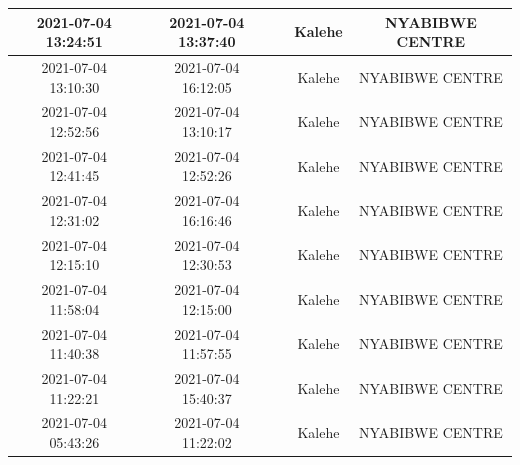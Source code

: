 \documentclass[
]{book}
\begin{document}
\begin{table}
\begin{tabular}[t]{c|c|>{}c|c|c}
\hline
2021-07-04 13:24:51 & 2021-07-04 13:37:40 & \cellcolor[HTML]{2C728E}{\textcolor{white}{13}} & Kalehe & NYABIBWE CENTRE\\
\hline
2021-07-04 13:10:30 & 2021-07-04 16:12:05 & \cellcolor[HTML]{31688E}{\textcolor{white}{182}} & Kalehe & NYABIBWE CENTRE\\
\hline
2021-07-04 12:52:56 & 2021-07-04 13:10:17 & \cellcolor[HTML]{2A788E}{\textcolor{white}{17}} & Kalehe & NYABIBWE CENTRE\\
\hline
2021-07-04 12:41:45 & 2021-07-04 12:52:26 & \cellcolor[HTML]{1F988B}{\textcolor{white}{11}} & Kalehe & NYABIBWE CENTRE\\
\hline
2021-07-04 12:31:02 & 2021-07-04 16:16:46 & \cellcolor[HTML]{23888E}{\textcolor{white}{226}} & Kalehe & NYABIBWE CENTRE\\
\hline
2021-07-04 12:15:10 & 2021-07-04 12:30:53 & \cellcolor[HTML]{23888E}{\textcolor{white}{16}} & Kalehe & NYABIBWE CENTRE\\
\hline
2021-07-04 11:58:04 & 2021-07-04 12:15:00 & \cellcolor[HTML]{365D8D}{\textcolor{white}{17}} & Kalehe & NYABIBWE CENTRE\\
\hline
2021-07-04 11:40:38 & 2021-07-04 11:57:55 & \cellcolor[HTML]{1F988B}{\textcolor{white}{17}} & Kalehe & NYABIBWE CENTRE\\
\hline
2021-07-04 11:22:21 & 2021-07-04 15:40:37 & \cellcolor[HTML]{277E8E}{\textcolor{white}{258}} & Kalehe & NYABIBWE CENTRE\\
\hline
2021-07-04 05:43:26 & 2021-07-04 11:22:02 & \cellcolor[HTML]{218E8D}{\textcolor{white}{339}} & Kalehe & NYABIBWE CENTRE\\
\hline
\end{tabular}
\end{table}
\end{document}
